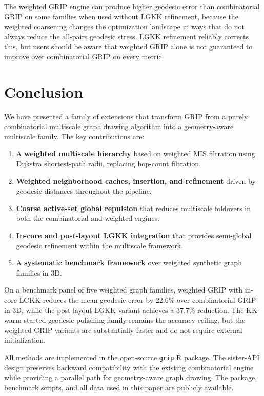 \documentclass[11pt,twocolumn]{article}
\newcommand{\grip}{\texttt{grip}}
\begin{document}
The weighted GRIP engine can produce higher geodesic error than
combinatorial GRIP on some families when used without LGKK refinement,
because the weighted coarsening changes the optimization landscape in
ways that do not always reduce the all-pairs geodesic stress.  LGKK
refinement reliably corrects this, but users should be aware that
weighted GRIP alone is not guaranteed to improve over combinatorial GRIP
on every metric.


\section{Conclusion}\label{sec:conclusion}

We have presented a family of extensions that transform GRIP from a
purely combinatorial multiscale graph drawing algorithm into a
geometry-aware multiscale family.  The key contributions are:

\begin{enumerate}
\item A \textbf{weighted multiscale hierarchy} based on weighted MIS
  filtration using Dijkstra shortest-path radii, replacing hop-count
  filtration.
\item \textbf{Weighted neighborhood caches, insertion, and refinement}
  driven by geodesic distances throughout the pipeline.
\item \textbf{Coarse active-set global repulsion} that reduces multiscale
  foldovers in both the combinatorial and weighted engines.
\item \textbf{In-core and post-layout LGKK integration} that provides
  semi-global geodesic refinement within the multiscale framework.
\item A \textbf{systematic benchmark framework} over weighted synthetic
  graph families in 3D.
\end{enumerate}

On a benchmark panel of five weighted graph families, weighted GRIP with
in-core LGKK reduces the mean geodesic error by 22.6\% over
combinatorial GRIP in 3D, while the post-layout LGKK variant achieves a
37.7\% reduction.  The KK-warm-started geodesic polishing family remains
the accuracy ceiling, but the weighted GRIP variants are substantially
faster and do not require external initialization.

All methods are implemented in the open-source \grip{} R package.  The
sister-API design preserves backward compatibility with the existing
combinatorial engine while providing a parallel path for geometry-aware
graph drawing.  The package, benchmark scripts, and all data used in this
paper are publicly available.
\end{document}

